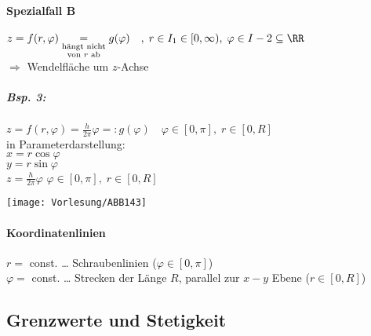 \paragraph{Spezialfall B} $z=f(r,\varphi)\underset{\substack{\text{hängt nicht}\\\text{von }r\text{ ab}}}{=}g(\varphi)\quad ,\;r\in I_1\in[0,\infty), \; \varphi \in I-2 \subseteq \RR$\\
$\Rightarrow$ Wendelfläche um $z$-Achse
\subparagraph{Bsp. 3:} $z=f(r,\varphi) = \frac{h}{2\pi}\varphi =: g(\varphi) \quad \varphi\in [0,\pi], \; r \in [0,R]$\\
in Parameterdarstellung:\\
$x=r\cos \varphi$\\
$y=r\sin \varphi$\\
$z=\frac{h}{2\pi}\varphi$ \quad $\varphi \in [0,\pi], \; r \in [0,R]$
\begin{center}
\texttt{[image: Vorlesung/ABB143]}
\end{center}
\paragraph{Koordinatenlinien}\parskp
$r=$ const. … Schraubenlinien \quad ($\varphi \in [0,\pi]$)\\
$\varphi=$ const. … Strecken der Länge $R$, parallel zur $x-y$ Ebene \quad ($r\in [0,R]$)

\subsection{Grenzwerte und Stetigkeit}
